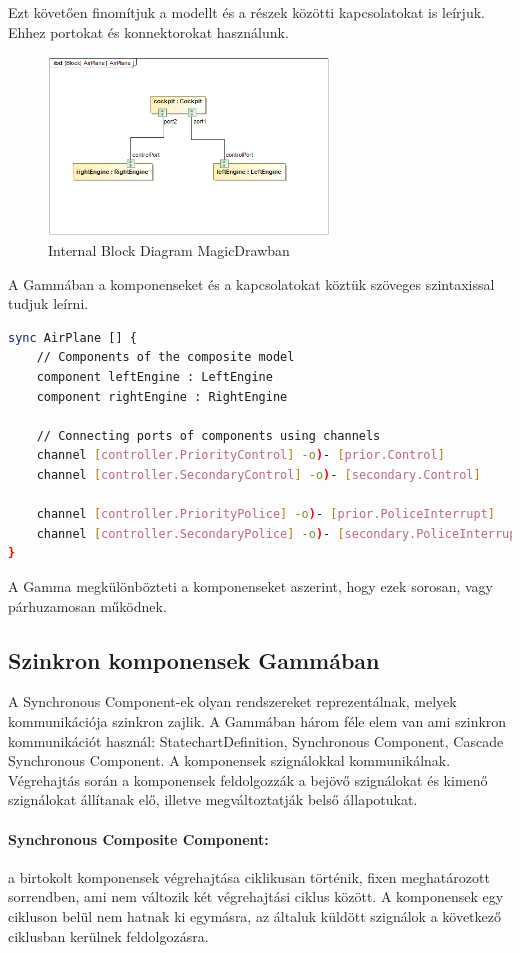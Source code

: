 Ezt követően finomítjuk a modellt és a részek közötti kapcsolatokat is leírjuk. Ehhez portokat és konnektorokat használunk.
 
 \begin{figure}[!ht]
	\centering
	\includegraphics[width=75mm]{figures/exampleibd.png}
	\caption{Internal Block Diagram MagicDrawban}
\end{figure}

A Gammában a komponenseket és a kapcsolatokat köztük szöveges szintaxissal tudjuk leírni.

\begin{lstlisting}[language=bash,frame=single,float=!ht]
sync AirPlane [] {
	// Components of the composite model
	component leftEngine : LeftEngine
	component rightEngine : RightEngine

	// Connecting ports of components using channels
	channel [controller.PriorityControl] -o)- [prior.Control]
	channel [controller.SecondaryControl] -o)- [secondary.Control]

	channel [controller.PriorityPolice] -o)- [prior.PoliceInterrupt]
	channel [controller.SecondaryPolice] -o)- [secondary.PoliceInterrupt]
}
\end{lstlisting}


A Gamma megkülönbözteti a komponenseket aszerint, hogy ezek sorosan, vagy párhuzamosan működnek.
\subsection{Szinkron komponensek Gammában}
A Synchronous Component-ek olyan rendszereket reprezentálnak, melyek kommunikációja szinkron zajlik. A Gammában három féle elem van ami szinkron kommunikációt használ: StatechartDefinition, Synchronous Component, Cascade Synchronous Component. A komponensek szignálokkal kommunikálnak. Végrehajtás során a komponensek feldolgozzák a bejövő szignálokat és kimenő szignálokat állítanak elő, illetve megváltoztatják belső állapotukat.

\paragraph{Synchronous Composite Component:} a birtokolt komponensek végrehajtása ciklikusan történik, fixen meghatározott sorrendben, ami nem változik két végrehajtási ciklus között. A komponensek egy cikluson belül nem hatnak ki egymásra, az általuk küldött szignálok a következő ciklusban kerülnek feldolgozásra.

